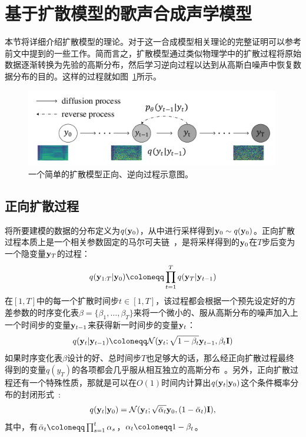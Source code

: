 \section{基于扩散模型的歌声合成声学模型}
本节将详细介绍扩散模型的理论。对于这一合成模型相关理论的完整证明可以参考前文中提到的一些工作\citep{Ho2020ddpm,kong2021diffwave,song2021denoising}。简而言之，扩散模型通过类似物理学中的扩散过程将原始数据逐渐转换为先验的高斯分布，然后学习逆向过程以达到从高斯白噪声中恢复数据分布的目的。这样的过程就如图~\ref{fig:two_process}所示。
\begin{figure}[htbp]
	\centering
	\includegraphics[width=0.99\textwidth]{figure/svs/diffusion-new.pdf}
	\caption{一个简单的扩散模型正向、逆向过程示意图。}
	\label{fig:two_process}
\end{figure}
\subsection{正向扩散过程}
将所要建模的数据的分布定义为$q(\mathbf{y}_0)$，从中进行采样得到$\mathbf{y}_0\sim q(\mathbf{y}_0)$。正向扩散过程本质上是一个相关参数固定的马尔可夫链~\citep{Ho2020ddpm}，是将采样得到的$\mathbf{y}_0$在$T$步后变为一个隐变量$\mathbf{y}_T$的过程：
\begin{equation}
  q(\by_{1:T} | \by_0) \defeq \prod_{t=1}^T q(\by_T | \by_{t-1} )
\end{equation}
在$[1, T]$中的每一个扩散时间步$t \in [1, T]$，该过程都会根据一个预先设定好的方差参数的时序变化表$\beta = \{\beta_1, \dotsc, \beta_T\}$来将一个微小的、服从高斯分布的噪声加入上一个时间步的变量$\mathbf{y}_{t-1}$来获得新一时间步的变量$\mathbf{y}_t$：
\begin{equation}
  q(\by_t|\by_{t-1}) \defeq \mathcal{N}(\by_t;\sqrt{1-\beta_t}\by_{t-1},\beta_t \bI)
\end{equation}
如果时序变化表$\beta$设计的好、总时间步$T$也足够大的话，那么经正向扩散过程最终得到的变量$q(y_T)$的各项都会几乎服从相互独立的高斯分布~\citep{Ho2020ddpm,nichol2021improved}。另外，正向扩散过程还有一个特殊性质，那就是可以在$O(1)$时间内计算出$q(\mathbf{y}_t|\mathbf{y}_0)$这个条件概率分布的封闭形式~\citep{Ho2020ddpm}:
\begin{align}
	q(\mathbf{y}_t|\mathbf{y}_0) = \mathcal{N}(\mathbf{y}_t; \sqrt{\bar\alpha_t}\mathbf{y}_0, (1-\bar\alpha_t)\mathbf{I}), \label{eq:one_step_noise}
\end{align}
其中，有$\bar\alpha_t \defeq \prod_{s=1}^t \alpha_s$，$\alpha_t \defeq 1-\beta_t$。
